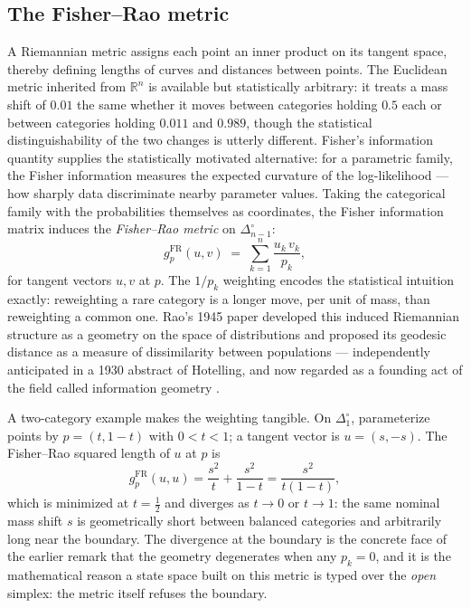 \subsection{The Fisher--Rao metric}\label{ch02:infogeo:metric}

A Riemannian metric assigns each point an inner product on its tangent
space, thereby defining lengths of curves and distances between points.
The Euclidean metric inherited from $\mathbb{R}^n$ is available but
statistically arbitrary: it treats a mass shift of $0.01$ the same
whether it moves between categories holding $0.5$ each or between
categories holding $0.011$ and $0.989$, though the statistical
distinguishability of the two changes is utterly different. Fisher's
information quantity \cite{fisher} supplies the statistically motivated
alternative: for a parametric family, the Fisher information measures
the expected curvature of the log-likelihood --- how sharply data
discriminate nearby parameter values. Taking the categorical family with
the probabilities themselves as coordinates, the Fisher information
matrix induces the \emph{Fisher--Rao metric} on
$\Delta_{n-1}^{\circ}$:
\[
g^{\mathrm{FR}}_p(u,v)\;=\;\sum_{k=1}^{n}\frac{u_k\,v_k}{p_k},
\]
for tangent vectors $u,v$ at $p$. The $1/p_k$ weighting encodes the
statistical intuition exactly: reweighting a rare category is a longer
move, per unit of mass, than reweighting a common one. Rao's 1945 paper
\cite{rao} developed this induced Riemannian structure as a geometry on
the space of distributions and proposed its geodesic distance as a
measure of dissimilarity between populations --- independently
anticipated in a 1930 abstract of Hotelling, and now regarded as a
founding act of the field called information geometry
\cite{amari,ay}.

A two-category example makes the weighting tangible. On
$\Delta_1^{\circ}$, parameterize points by $p=(t,1-t)$ with $0<t<1$; a
tangent vector is $u=(s,-s)$. The Fisher--Rao squared length of $u$ at
$p$ is
\[
g^{\mathrm{FR}}_p(u,u)=\frac{s^2}{t}+\frac{s^2}{1-t}
=\frac{s^2}{t(1-t)},
\]
which is minimized at $t=\tfrac12$ and diverges as $t\to 0$ or
$t\to 1$: the same nominal mass shift $s$ is geometrically short between
balanced categories and arbitrarily long near the boundary. The
divergence at the boundary is the concrete face of the earlier remark
that the geometry degenerates when any $p_k=0$, and it is the
mathematical reason a state space built on this metric is typed over the
\emph{open} simplex: the metric itself refuses the boundary.

